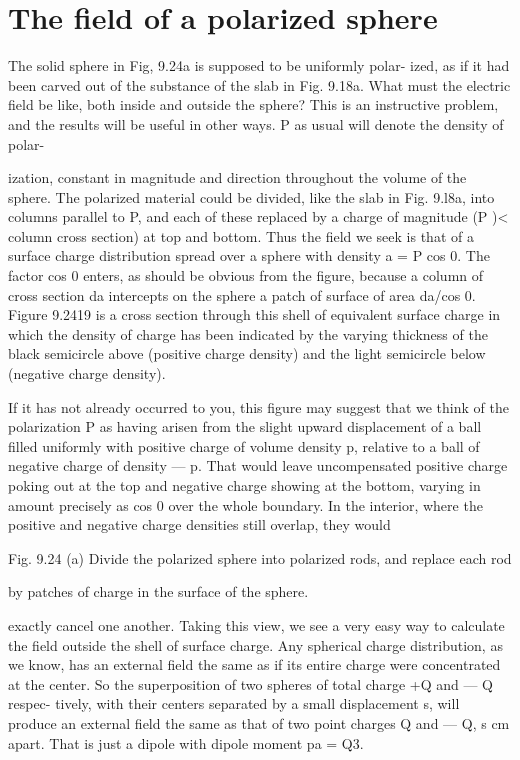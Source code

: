\iffalse

\section{The field of a polarized sphere}

The solid sphere in Fig, 9.24a is supposed to be uniformly polar-
ized, as if it had been carved out of the substance of the slab in
Fig. 9.18a. What must the electric field be like, both inside and outside
the sphere? This is an instructive problem, and the results will
be useful in other ways. P as usual will denote the density of polar-

ization, constant in magnitude and direction throughout the volume
of the sphere. The polarized material could be divided, like the slab
in Fig. 9.l8a, into columns parallel to P, and each of these replaced
by a charge of magnitude (P )< column cross section) at top and
bottom. Thus the field we seek is that of a surface charge distribution
spread over a sphere with density a = P cos 0. The factor cos 0
enters, as should be obvious from the figure, because a column of
cross section da intercepts on the sphere a patch of surface of area
da/cos 0. Figure 9.2419 is a cross section through this shell of equivalent
surface charge in which the density of charge has been indicated
by the varying thickness of the black semicircle above (positive
charge density) and the light semicircle below (negative charge
density).

If it has not already occurred to you, this figure may suggest that
we think of the polarization P as having arisen from the slight upward
displacement of a ball filled uniformly with positive charge of
volume density p, relative to a ball of negative charge of density  --- p.
That would leave uncompensated positive charge poking out at the
top and negative charge showing at the bottom, varying in amount
precisely as cos 0 over the whole boundary. In the interior, where
the positive and negative charge densities still overlap, they would

 

Fig. 9.24 (a) Divide the polarized sphere
into polarized rods, and replace each rod

by patches of charge in the surface of the
sphere.

exactly cancel one another. Taking this view, we see a very easy way
to calculate the field outside the shell of surface charge. Any
spherical charge distribution, as we know, has an external field the
same as if its entire charge were concentrated at the center. So the
superposition of two spheres of total charge +Q and  --- Q respec-
tively, with their centers separated by a small displacement s, will
produce an external field the same as that of two point charges Q and
 ---  Q, s cm apart. That is just a dipole with dipole moment pa = Q3.

